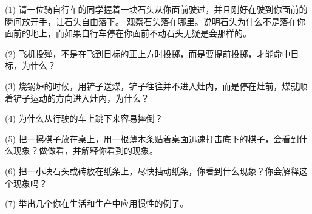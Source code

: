 \lianxi

(1) 请一位骑自行车的同学握着一块石头从你面前驶过，并且刚好在驶到你面前的瞬间放开手，让石头自由落下。
观察石头落在哪里。说明石头为什么不是落在你面前的地上，而如果自行车停在你面前不动石头无疑是会那样的。

(2) 飞机投殚，不是在飞到目标的正上方时投掷，而是要提前投掷，才能命中目标，为什么？

(3) 烧锅炉的时候，用铲子送煤，铲子往往并不进入灶内，而是停在灶前，煤就顺着铲子运动的方向进入灶内，为什么？

(4) 为什么从行驶的车上跳下来容易摔倒？

(5) 把一摞棋子放在桌上，用一根薄木条贴着桌面迅速打击底下的棋子，会看到什么现象？做做看，并解释你看到的现象。

(6) 把一小块石头或砖放在纸条上，尽快抽动纸条，你看到什么现象？你会解释这个现象吗？

(7) 举出几个你在生活和生产中应用惯性的例子。



